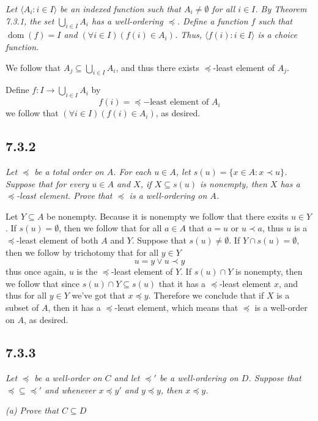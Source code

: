 \documentclass[11pt,oneside,titlepage]{book}
\DeclareMathOperator \dom {dom}
\newcommand{\eangle}[1]{\langle #1 \rangle}
\newcommand{\set}[1]{\{ #1 \}}
\begin{document}
\textit{Let $\eangle{A_i: i \in I}$ be an indexed function such that $A_i \neq \emptyset$ for
  all $i \in I$. By Theorem 7.3.1, the set $\bigcup_{i \in I}{A_i}$ has a well-ordering
  $\preceq$. Define a function $f$ such that $\dom(f) = I$ and
  $(\forall i \in I)(f(i) \in A_i)$. Thus, $\eangle{f(i): i \in I}$ is a choice
  function.}

We follow that $A_j \subseteq \bigcup_{i \in I}{A_i}$, and thus there
exists $\preceq$-least element of $A_j$.

Define $f: I \to \bigcup_{i \in I}{A_i}$ by
$$f(i) = \preceq-\text{least element of } A_i$$
we follow that $(\forall i \in I)(f(i) \in A_i)$, as desired.

\subsection*{7.3.2}

\textit{Let $\preceq$ be a total order on $A$. For each $u \in A$, let
  $s(u) = \set{x \in A: x \prec u}$. Suppose that for every $u \in A$ and $X$,
  if $X \subseteq s(u)$  is nonempty, then $X$ has a $\preceq$-least element.
  Prove that $\preceq$ is a well-ordering on $A$.}

Let $Y \subseteq A$ be nonempty. Because it is nonempty we follow that there exsits $u \in Y$.
If $s(u) = \emptyset$, then we follow that for all $a \in A$ that $a = u$ or $u \prec a$, thus
$u$ is a $\preceq$-least element of both $A$ and $Y$. Suppose that $s(u) \neq \emptyset$.
If $Y \cap s(u) = \emptyset$, then we follow by trichotomy that for all $y \in Y$
$$u = y \lor u \prec y$$
thus once again, $u$ is the $\preceq$-least element of $Y$. If $s(u) \cap Y$ is
nonempty, then we follow that since $s(u) \cap Y \subseteq s(u)$ that
it has a $\preceq$-least element $x$, and thus for all $y \in Y$ we've got that
$x \preceq y$. Therefore we conclude that if $X$ is a subset of $A$, then it has a
$\preceq$-least element, which means that $\preceq$ is a well-order on $A$, as desired.

\subsection*{7.3.3}

\textit{Let $\preceq$ be a well-order on $C$ and let $\preceq'$ be a well-ordering
  on $D$. Suppose that $\preceq \subseteq \preceq'$ and whenever $x \preceq y'$ and
  $y \preceq y$, then $x \preceq y$.}

\textit{(a) Prove that $C \subseteq D$}
\end{document}
